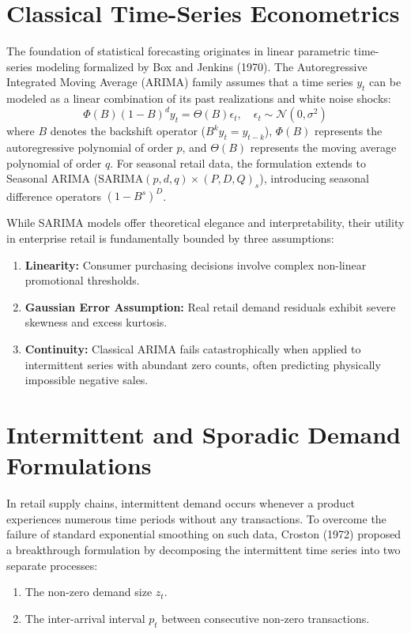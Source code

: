 \documentclass[12pt,a4paper,oneside]{report}
\theoremstyle{definition}
\begin{document}
\section{Classical Time-Series Econometrics}
The foundation of statistical forecasting originates in linear parametric time-series modeling formalized by Box and Jenkins (1970). The Autoregressive Integrated Moving Average (ARIMA) family assumes that a time series $y_t$ can be modeled as a linear combination of its past realizations and white noise shocks:
\begin{equation}
\Phi(B)(1 - B)^d y_t = \Theta(B)\epsilon_t, \quad \epsilon_t \sim \mathcal{N}(0, \sigma^2)
\end{equation}
where $B$ denotes the backshift operator ($B^k y_t = y_{t-k}$), $\Phi(B)$ represents the autoregressive polynomial of order $p$, and $\Theta(B)$ represents the moving average polynomial of order $q$. For seasonal retail data, the formulation extends to Seasonal ARIMA ($\text{SARIMA}(p,d,q)\times(P,D,Q)_s$), introducing seasonal difference operators $(1 - B^s)^D$. 

While SARIMA models offer theoretical elegance and interpretability, their utility in enterprise retail is fundamentally bounded by three assumptions:
\begin{enumerate}
    \item \textbf{Linearity:} Consumer purchasing decisions involve complex non-linear promotional thresholds.
    \item \textbf{Gaussian Error Assumption:} Real retail demand residuals exhibit severe skewness and excess kurtosis.
    \item \textbf{Continuity:} Classical ARIMA fails catastrophically when applied to intermittent series with abundant zero counts, often predicting physically impossible negative sales.
\end{enumerate}

\section{Intermittent and Sporadic Demand Formulations}
In retail supply chains, intermittent demand occurs whenever a product experiences numerous time periods without any transactions. To overcome the failure of standard exponential smoothing on such data, Croston (1972) proposed a breakthrough formulation by decomposing the intermittent time series into two separate processes:
\begin{enumerate}
    \item The non-zero demand size $z_t$.
    \item The inter-arrival interval $p_t$ between consecutive non-zero transactions.
\end{enumerate}
\end{document}
